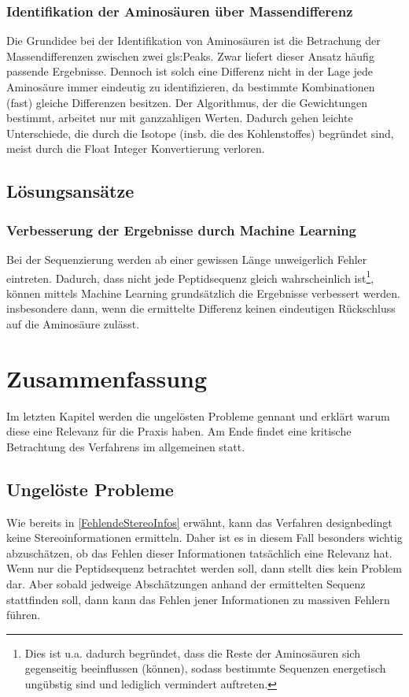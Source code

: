 \documentclass[a4paper, 12pt]{article}
\begin{document}
\subsubsection{Identifikation der Aminosäuren über Massendifferenz}
Die Grundidee bei der Identifikation von Aminosäuren ist die Betrachung der Massendifferenzen zwischen zwei \glspl{gls:Peak}. Zwar liefert dieser Ansatz häufig passende Ergebnisse. Dennoch ist solch eine Differenz nicht in der Lage jede Aminosäure immer eindeutig zu identifizieren, da bestimmte Kombinationen (fast) gleiche Differenzen besitzen. Der Algorithmus, der die Gewichtungen bestimmt, arbeitet nur mit ganzzahligen Werten. Dadurch gehen leichte Unterschiede, die durch die Isotope (insb. die des Kohlenstoffes) begründet sind, meist durch die Float Integer Konvertierung verloren.

\subsection{Lösungsansätze}
\subsubsection{Verbesserung der Ergebnisse durch Machine Learning}
Bei der Sequenzierung werden ab einer gewissen Länge unweigerlich Fehler eintreten.\cite[S.621,Figure 5]{pNovoPlus} Dadurch, dass nicht jede Peptidsequenz gleich wahrscheinlich ist\footnote{Dies ist u.a. dadurch begründet, dass die Reste der Aminosäuren sich gegenseitig beeinflussen (können), sodass bestimmte Sequenzen energetisch ungübstig sind und lediglich vermindert auftreten.}, können mittels Machine Learning grundsätzlich die Ergebnisse verbessert werden. insbesondere dann, wenn die ermittelte Differenz keinen eindeutigen Rückschluss auf die Aminosäure zulässt.

\section{Zusammenfassung}
Im letzten Kapitel werden die ungelösten Probleme gennant und erklärt warum diese eine Relevanz für die Praxis haben. Am Ende findet eine kritische Betrachtung des Verfahrens im allgemeinen statt.

\subsection{Ungelöste Probleme}
Wie bereits in \ref{FehlendeStereoInfos} erwähnt, kann das Verfahren designbedingt keine Stereoinformationen ermitteln. Daher ist es in diesem Fall besonders wichtig abzuschätzen, ob das Fehlen dieser Informationen tatsächlich eine Relevanz hat. Wenn nur die Peptidsequenz betrachtet werden soll, dann stellt dies kein Problem dar. Aber sobald jedweige Abschätzungen anhand der ermittelten Sequenz stattfinden soll, dann kann das Fehlen jener Informationen zu massiven Fehlern führen.\\
\end{document}
